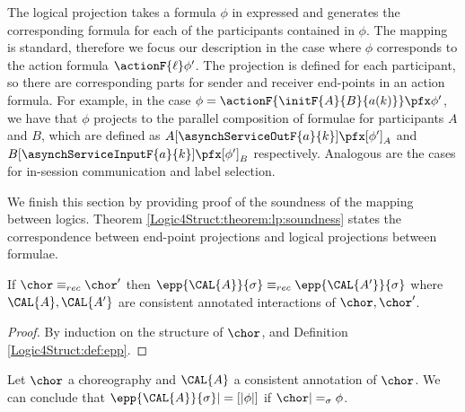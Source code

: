The logical projection takes a formula $\phi$ in expressed \GL and generates the
corresponding \LL formula for each of the participants
contained in $\phi$. The mapping is standard, therefore we focus our
description in the case where $\phi$ corresponds to the action formula
$\actionF{\ell} \phi'$. The projection is defined for each
participant, so there are corresponding parts for sender and receiver
end-points in an action formula. For example, in the case $\phi =
\actionF{\initF{A}{B}{a(k)}} \pfx \phi'$, we have that $\phi$ projects
to the parallel composition of formulae for participants $A$ and $B$,
which are defined as $A[ \asynchServiceOutF{a}{k} ] \pfx [ \phi']_A$
and $B[ \asynchServiceInputF{a}{k} ] \pfx [ \phi' ]_B$
respectively. Analogous are the cases for in-session communication and
label selection.

We finish this section  by providing proof of the soundness of the
mapping between logics. Theorem
\ref{Logic4Struct:theorem:lp:soundness} states the correspondence
between end-point projections and logical projections between formulae.



\begin{lemma}\label{Logic4Struct:lemma:epp-equiv}

If $\chor \equiv_{rec} \chor'$ then $\epp{\CAL{A}}{\sigma}
\equiv_{rec} \epp{\CAL{A'}}{\sigma}$ where $\CAL{A},\CAL{A'}$ are
consistent annotated interactions of $\chor, \chor'$.
\begin{proof}
  By induction on the structure of  $\chor$, and Definition
\ref{Logic4Struct:def:epp}.
\end{proof}
\end{lemma}






\begin{theorem} \label{Logic4Struct:theorem:lp:soundness}
Let $\chor$ a choreography and $\CAL{A}$ a consistent annotation of
$\chor$. We can conclude that $\epp{\CAL{A}}{\sigma} |= [| \phi |]$
if $\chor |=_\sigma \phi$.
\end{theorem}

